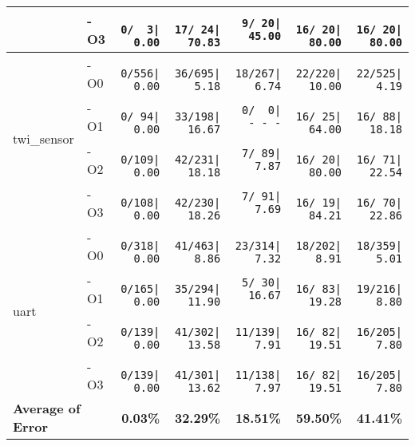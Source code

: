 \begin{tabular}{@{}llrrrrr@{}}
    & -O3 & \texttt{  0/~~3|~~0.00} & \texttt{ 17/~24|~70.83} & \texttt{  9/~20|~45.00} & \texttt{ 16/~20|~80.00} & \texttt{ 16/~20|~80.00} \\ \midrule
\multirow{4}{*}{twi\_sensor}
    & -O0 & \texttt{  0/556|~~0.00} & \texttt{ 36/695|~~5.18} & \texttt{ 18/267|~~6.74} & \texttt{ 22/220|~10.00} & \texttt{ 22/525|~~4.19} \\
    & -O1 & \texttt{  0/~94|~~0.00} & \texttt{ 33/198|~16.67} & \texttt{  0/~~0|~-~-~-} & \texttt{ 16/~25|~64.00} & \texttt{ 16/~88|~18.18} \\
    & -O2 & \texttt{  0/109|~~0.00} & \texttt{ 42/231|~18.18} & \texttt{  7/~89|~~7.87} & \texttt{ 16/~20|~80.00} & \texttt{ 16/~71|~22.54} \\
    & -O3 & \texttt{  0/108|~~0.00} & \texttt{ 42/230|~18.26} & \texttt{  7/~91|~~7.69} & \texttt{ 16/~19|~84.21} & \texttt{ 16/~70|~22.86} \\ \midrule
\multirow{4}{*}{uart}
    & -O0 & \texttt{  0/318|~~0.00} & \texttt{ 41/463|~~8.86} & \texttt{ 23/314|~~7.32} & \texttt{ 18/202|~~8.91} & \texttt{ 18/359|~~5.01} \\
    & -O1 & \texttt{  0/165|~~0.00} & \texttt{ 35/294|~11.90} & \texttt{  5/~30|~16.67} & \texttt{ 16/~83|~19.28} & \texttt{ 19/216|~~8.80} \\
    & -O2 & \texttt{  0/139|~~0.00} & \texttt{ 41/302|~13.58} & \texttt{ 11/139|~~7.91} & \texttt{ 16/~82|~19.51} & \texttt{ 16/205|~~7.80} \\
    & -O3 & \texttt{  0/139|~~0.00} & \texttt{ 41/301|~13.62} & \texttt{ 11/138|~~7.97} & \texttt{ 16/~82|~19.51} & \texttt{ 16/205|~~7.80} \\ \midrule
\multicolumn{2}{l}{\textbf{Average of Error}}
    & \textbf{0.03\%} & \textbf{32.29\%} & \textbf{18.51\%} & \textbf{59.50\%} & \textbf{41.41\%} \\ \bottomrule
\end{tabular}